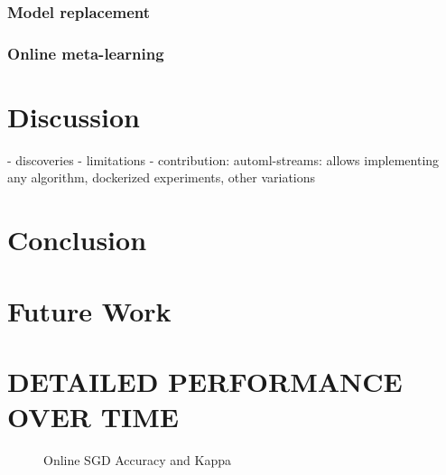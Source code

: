 \documentclass{sig-alternate-br}
\begin{document}
\subsubsection{Model replacement}
\subsubsection{Online meta-learning}




\section{Discussion}

- discoveries
- limitations
- contribution: automl-streams: allows implementing any algorithm, dockerized experiments, other variations

\section{Conclusion}

\section{Future Work}


  
%


\appendix

\section{DETAILED PERFORMANCE OVER TIME}

\begin{figure*}
\centering 
{}
\caption{Online SGD Accuracy and Kappa}
\label{fig:onlinesgd}
\end{figure*}
\end{document}
